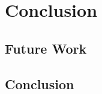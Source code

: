\chapter{Conclusion}
\label{chapter:chapter6}

\section{Future Work}
\label{sec:future-work}

\section{Conclusion}
\label{sec:system-architecture}

